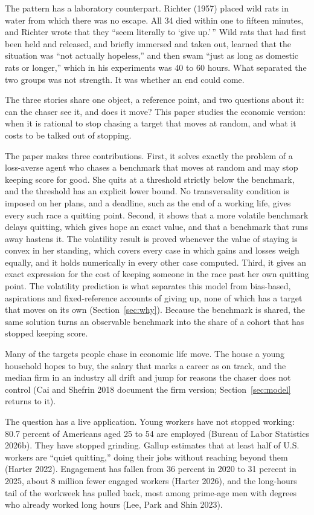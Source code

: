 \documentclass[12pt]{article}
\theoremstyle{definition}
\theoremstyle{remark}
\theoremstyle{plain}
\theoremstyle{definition}
\begin{document}
The pattern has a laboratory counterpart. Richter (1957) placed wild rats in water from which there was no escape. All 34 died within one to fifteen minutes, and Richter wrote that they ``seem literally to `give up.'\,'' Wild rats that had first been held and released, and briefly immersed and taken out, learned that the situation was ``not actually hopeless,'' and then swam ``just as long as domestic rats or longer,'' which in his experiments was 40 to 60 hours. What separated the two groups was not strength. It was whether an end could come.

The three stories share one object, a reference point, and two questions about it: can the chaser see it, and does it move? This paper studies the economic version: when it is rational to stop chasing a target that moves at random, and what it costs to be talked out of stopping.

The paper makes three contributions. First, it solves exactly the problem of a loss-averse agent who chases a benchmark that moves at random and may stop keeping score for good. She quits at a threshold strictly below the benchmark, and the threshold has an explicit lower bound. No transversality condition is imposed on her plans, and a deadline, such as the end of a working life, gives every such race a quitting point. Second, it shows that a more volatile benchmark delays quitting, which gives hope an exact value, and that a benchmark that runs away hastens it. The volatility result is proved whenever the value of staying is convex in her standing, which covers every case in which gains and losses weigh equally, and it holds numerically in every other case computed. Third, it gives an exact expression for the cost of keeping someone in the race past her own quitting point. The volatility prediction is what separates this model from bias-based, aspirations and fixed-reference accounts of giving up, none of which has a target that moves on its own (Section~\ref{sec:why}). Because the benchmark is shared, the same solution turns an observable benchmark into the share of a cohort that has stopped keeping score.

Many of the targets people chase in economic life move. The house a young household hopes to buy, the salary that marks a career as on track, and the median firm in an industry all drift and jump for reasons the chaser does not control (Cai and Shefrin 2018 document the firm version; Section~\ref{sec:model} returns to it).

The question has a live application. Young workers have not stopped working: 80.7 percent of Americans aged 25 to 54 are employed (Bureau of Labor Statistics 2026b). They have stopped grinding. Gallup estimates that at least half of U.S. workers are ``quiet quitting,'' doing their jobs without reaching beyond them (Harter 2022). Engagement has fallen from 36 percent in 2020 to 31 percent in 2025, about 8 million fewer engaged workers (Harter 2026), and the long-hours tail of the workweek has pulled back, most among prime-age men with degrees who already worked long hours (Lee, Park and Shin 2023).
\end{document}
